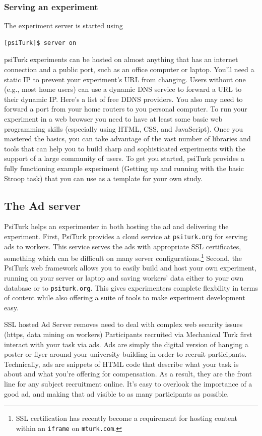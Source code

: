 \documentclass[twocolumn]{svjour3}          %
\begin{document}
\subsubsection{Serving an experiment}

The experiment server is started using

\begin{lstlisting}
[psiTurk]$ server on
\end{lstlisting}


psiTurk experiments can be hosted on almost anything that has an internet connection and a public port, such as an office computer or laptop.
You'll need a static IP to prevent your experiment's URL from changing. 
Users without one (e.g., most home users) can use a dynamic DNS service to forward a URL to their dynamic IP.
Here's a list of free DDNS providers.
You also may need to forward a port from your home routers to you personal computer.
To run your experiment in a web browser you need to have at least some basic web programming skills (especially using HTML, CSS, and JavaScript).
Once you mastered the basics, you can take advantage of the vast number of libraries and tools that can help you to build sharp and sophisticated experiments with the support of a large community of users.
To get you started, psiTurk provides a fully functioning example experiment (Getting up and running with the basic Stroop task) that you can use as a template for your own study.


\subsection{The Ad server}

PsiTurk helps an experimenter in both hosting the ad and delivering the experiment.
First, PsiTurk provides a cloud service at \texttt{psiturk.org} for serving ads to workers.
This service serves the ads with appropriate SSL certificates, something which can be difficult on many server configurations.\footnote{SSL certification has recently become a requirement for hosting content within an \texttt{iframe} on \texttt{mturk.com}.}
Second, the PsiTurk web framework allows you to easily build and host your own experiment, running on your server or laptop and saving workers' data either to your own database  or to \texttt{psiturk.org}.
This gives experimenters complete flexbility in terms of content while also offering a suite of tools to make experiment development easy.

SSL hosted Ad Server removes need to deal with complex web security issues (https, data mining on workers) 
Participants recruited via Mechanical Turk first interact with your task via ads. Ads are simply the digital version of hanging a poster or flyer around your university building in order to recruit participants. Technically, ads are snippets of HTML code that describe what your task is about and what you're offering for compensation. As a result, they are the front line for any subject recruitment online. It's easy to overlook the importance of a good ad, and making that ad visible to as many participants as possible.
\end{document}
